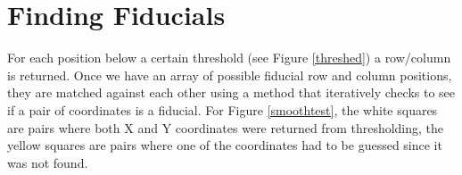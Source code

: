 \documentclass[10pt]{scrartcl}
\begin{document}
\section{Finding Fiducials} %
\label{sec:finding_fiducials}

For each position below a certain threshold (see Figure \ref{threshed}) a row/column  is returned. Once we have an array of possible fiducial row and column positions, they are matched against each other using a method that iteratively checks to see if a pair of coordinates is a fiducial. For Figure \ref{smoothtest}, the white squares are pairs where both X and Y coordinates were returned from thresholding, the yellow squares are pairs where one of the coordinates had to be guessed since it was not found.

   
\end{document}
